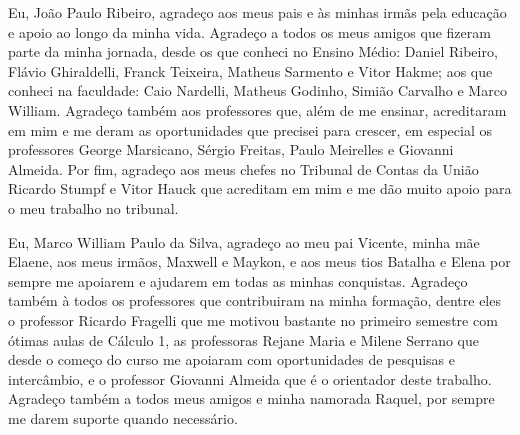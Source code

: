 \begin{agradecimentos}
Eu, João Paulo Ribeiro, agradeço aos meus pais e às minhas irmãs pela educação e apoio ao longo da minha vida. Agradeço a todos os meus amigos que fizeram parte da minha jornada, desde os que conheci no Ensino Médio: Daniel Ribeiro, Flávio Ghiraldelli, Franck Teixeira, Matheus Sarmento e Vitor Hakme; aos que conheci na faculdade: Caio Nardelli, Matheus Godinho, Simião Carvalho e Marco William. Agradeço também aos professores que, além de me ensinar, acreditaram em mim e me deram as oportunidades que precisei para crescer, em especial os professores George Marsicano, Sérgio Freitas, Paulo Meirelles e Giovanni Almeida. Por fim, agradeço aos meus chefes no Tribunal de Contas da União Ricardo Stumpf e Vitor Hauck que acreditam em mim e me dão muito apoio para o meu trabalho no tribunal.

Eu, Marco William Paulo da Silva, agradeço ao meu pai Vicente, minha mãe Elaene, aos meus irmãos, Maxwell e Maykon, e aos meus tios Batalha e Elena por sempre me apoiarem e ajudarem em todas as minhas conquistas. Agradeço também à todos os professores que contribuiram na minha formação, dentre eles o professor Ricardo Fragelli que me motivou bastante no primeiro semestre com ótimas aulas de Cálculo 1, as professoras Rejane Maria e Milene Serrano que desde o começo do curso me apoiaram com oportunidades de pesquisas e intercâmbio, e o professor Giovanni Almeida que é o orientador deste trabalho. Agradeço também a todos meus amigos e minha namorada Raquel, por sempre me darem suporte quando necessário.
\end{agradecimentos}

